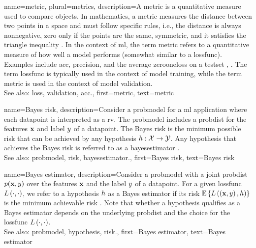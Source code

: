 {name={metric}, plural={metrics},
	description={A metric is a quantitative measure used to compare objects. 
	     In mathematics, a metric measures the distance 
		 between two points in a space and must follow specific rules, i.e., the distance is always 
		 nonnegative, zero only if the points are the same, symmetric, and it satisfies the 
		triangle inequality \cite{RudinBookPrinciplesMatheAnalysis}. In the context of 
		\gls{ml}, the term metric refers to a quantitative measure of how well a \gls{model} performs (somewhat 
		similar to a \gls{lossfunc}). Examples include \gls{acc}, precision, and the average 
		\gls{zerooneloss} on a \gls{testset} \cite{Goodfellow-et-al-2016}, \cite{BishopBook}. 
		The term \gls{lossfunc} is typically used in the context of \gls{model} \gls{training}, 
		while the term metric is used in the context of \gls{model} \gls{validation}.
		\\ 
		See also: \gls{loss}, \gls{validation}, \gls{acc}.},
	first={metric}, 
	text={metric}
}

{name={Bayes risk},
	description={Consider a \gls{probmodel} for a \gls{ml} application where each 
	\gls{datapoint} is interpreted as a \gls{rv}. The \gls{probmodel} includes 
	a \gls{probdist} for the \glspl{feature} ${\bf x}$ and \gls{label} $y$ 
	of a \gls{datapoint}. The Bayes \gls{risk} is the \gls{minimum} 
	possible \gls{risk} that can be achieved by any \gls{hypothesis} $h: \mathcal{X} \rightarrow \mathcal{Y}$. 
		Any \gls{hypothesis} that achieves the Bayes \gls{risk} is referred to as a 
		\gls{bayesestimator} \cite{LC}.
		\\
		See also: \gls{probmodel}, \gls{risk}, \gls{bayesestimator}.},
	first={Bayes risk},
	text={Bayes risk}
}
	
{name={Bayes estimator},
	description={Consider a \gls{probmodel} with a joint \gls{probdist} 
		$p({\bf x},y)$ over the \glspl{feature} ${\bf x}$ and the \gls{label} $y$ 
		of a \gls{datapoint}. For a given \gls{lossfunc} $L\left(\cdot,\cdot \right)$, we refer to a \gls{hypothesis} 
		$h$ as a Bayes estimator if its \gls{risk} 
		$\mathbb{E}\left\{L\left(\left( {\bf x},y \right),h \right)\right\}$
		is the \gls{minimum} achievable \gls{risk} \cite{LC}. 
		Note that whether a \gls{hypothesis} qualifies as a Bayes estimator depends on 
		the underlying \gls{probdist} and the choice for the \gls{lossfunc} $L\left(\cdot,\cdot \right)$.
		\\
		See also: \gls{probmodel}, \gls{hypothesis}, \gls{risk}.},
	first={Bayes estimator},
	text={Bayes estimator}
}


